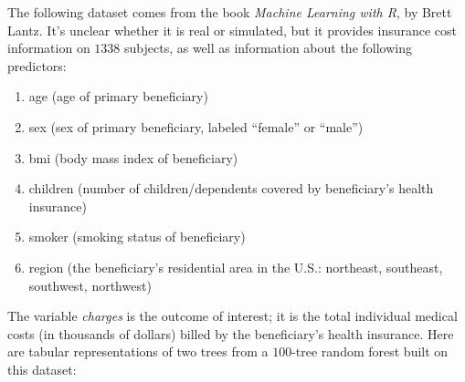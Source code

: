The following dataset comes from the book \emph{Machine Learning with R}, by Brett Lantz. It's unclear whether it is real or simulated, but it provides insurance cost information on $1338$ subjects, as well as information about the following predictors:

{\small
\begin{enumerate}[label=(\alph*)]
\item age (age of primary beneficiary)
\item sex (sex of primary beneficiary, labeled ``female'' or ``male'')
\item bmi (body mass index of beneficiary)
\item children (number of children/dependents covered by beneficiary's health insurance)
\item smoker (smoking status of beneficiary)
\item region (the beneficiary's residential area in the U.S.: northeast, southeast, southwest, northwest)
\end{enumerate}
}

The variable \emph{charges} is the outcome of interest; it is the total individual medical costs (in thousands of dollars) billed by the beneficiary's health insurance. Here are tabular representations of two trees from a $100$-tree random forest built on this dataset:
\vspace{-5mm}

